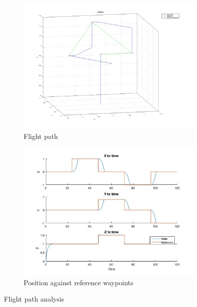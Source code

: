 \documentclass[12pt]{article}
\begin{document}
\begin{figure}[H]
    \begin{subfigure}{.5\linewidth}
        \centering
        \includegraphics[width=\textwidth]{figures/pid_flight_path.jpg}
        \caption{Flight path}
        \label{fig:pid_flight_path}
    \end{subfigure}
    \begin{subfigure}{.5\linewidth}
        \centering
        \includegraphics[width=\textwidth]{figures/evaluation_position}
        \caption{Position against reference waypoints}
        \label{fig:pid_position_evaluation}
    \end{subfigure}

    \caption{Flight path analysis}
\end{figure}
\end{document}
